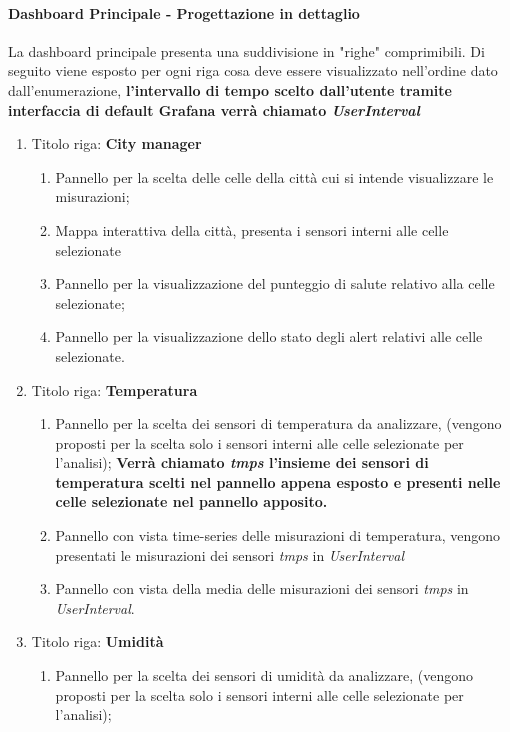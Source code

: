 \paragraph*{Dashboard Principale - Progettazione in dettaglio}
La dashboard principale presenta una suddivisione in "righe" comprimibili. Di seguito viene esposto per ogni riga cosa deve essere visualizzato nell'ordine dato dall'enumerazione, \textbf{ l'intervallo di tempo scelto dall'utente tramite interfaccia di default Grafana verrà chiamato \textit{UserInterval}}
\begin{enumerate}
    \item Titolo riga: \textbf{City manager}
    \begin{enumerate}
        \item Pannello per la scelta delle celle della città cui si intende visualizzare le misurazioni;
        \item Mappa interattiva della città, presenta i sensori interni alle celle selezionate
        \item Pannello per la visualizzazione del punteggio di salute relativo alla celle selezionate;
        \item Pannello per la visualizzazione dello stato degli alert relativi alle celle selezionate.
    \end{enumerate}
    \item Titolo riga: \textbf{Temperatura}
    \begin{enumerate}
        \item Pannello per la scelta dei sensori di temperatura da analizzare, (vengono proposti per la scelta solo i sensori interni alle celle selezionate per l'analisi);
        \textbf{Verrà chiamato \textit{tmps} l'insieme dei sensori di temperatura scelti nel pannello appena esposto e presenti nelle celle selezionate nel pannello apposito.}
        \item Pannello con vista time-series delle misurazioni di temperatura, vengono presentati le misurazioni dei sensori \textit{tmps} in \textit{UserInterval}
        \item Pannello con vista della media delle misurazioni dei sensori \textit{tmps} in \textit{UserInterval}.
    \end{enumerate}
    \item Titolo riga: \textbf{Umidità}
    \begin{enumerate}
        \item Pannello per la scelta dei sensori di umidità da analizzare, (vengono proposti per la scelta solo i sensori interni alle celle selezionate per l'analisi);

\end{enumerate}
\end{enumerate}
